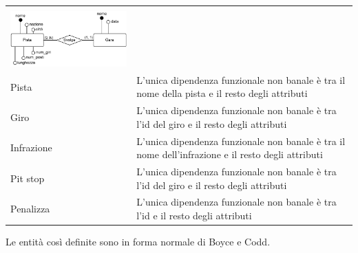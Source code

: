 \documentclass[11pt]{article}
\begin{document}
\begin{center}
\begin{tabular}{ |p{2cm}|p{14.5cm}| }
{{                Si procede quindi a spostare il numero dei giri da Gara a Pista.
            }\\
            \includegraphics[width=8cm]{../er/norm_pista.pdf}
        } \\
        \hline
        Pista & \par{L'unica dipendenza funzionale non banale è tra il nome della pista e il resto degli attributi} \\
        \hline
        Giro & \par{L'unica dipendenza funzionale non banale è tra l'id del giro e il resto degli attributi} \\
        \hline
        Infrazione & \par{L'unica dipendenza funzionale non banale è tra il nome dell'infrazione e il resto degli attributi} \\
        \hline
        Pit stop & \par{L'unica dipendenza funzionale non banale è tra l'id del giro e il resto degli attributi} \\
        \hline
        Penalizza & \par{L'unica dipendenza funzionale non banale è tra l'id e il resto degli attributi} \\
        \hline
    \end{tabular}
\end{center}
Le entità così definite sono in forma normale di Boyce e Codd.
\end{document}
